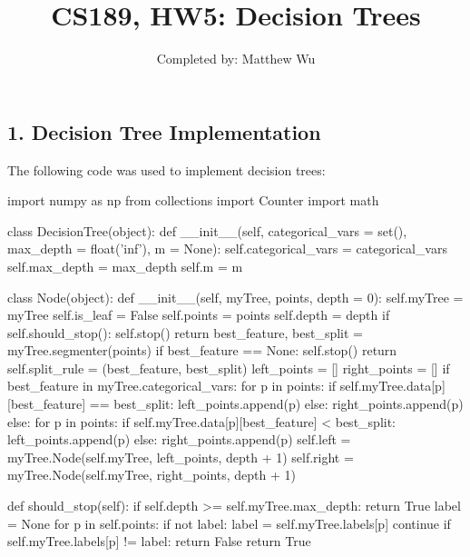 \documentclass{article}
\title{CS189, HW5: Decision Trees}
\author{ Completed by: Matthew Wu}
\date{}
\begin{document}
\maketitle

\subsection*{1. Decision Tree Implementation}
The following code was used to implement decision trees:

\begin{python}
import numpy as np
from collections import Counter
import math

class DecisionTree(object):
    def __init__(self, categorical_vars = set(), max_depth = float('inf'), m = None):
        self.categorical_vars = categorical_vars
        self.max_depth = max_depth
        self.m = m

    class Node(object):
        def __init__(self, myTree, points, depth = 0):
            self.myTree = myTree
            self.is_leaf = False
            self.points = points
            self.depth = depth
            if self.should_stop():
                self.stop()
                return
            best_feature, best_split = myTree.segmenter(points)
            if best_feature == None:
                self.stop()
                return
            self.split_rule = (best_feature, best_split)
            left_points = []
            right_points = []
            if best_feature in myTree.categorical_vars:
                for p in points:
                    if self.myTree.data[p][best_feature] == best_split:
                        left_points.append(p)
                    else:
                        right_points.append(p)
            else:
                for p in points:
                    if self.myTree.data[p][best_feature] < best_split:
                        left_points.append(p)
                    else:
                        right_points.append(p)
            self.left = myTree.Node(self.myTree, left_points, depth + 1)
            self.right = myTree.Node(self.myTree, right_points, depth + 1)

        def should_stop(self):
            if self.depth >= self.myTree.max_depth:
                return True
            label = None
            for p in self.points:
                if not label:
                    label = self.myTree.labels[p]
                    continue
                if self.myTree.labels[p] != label:
                    return False
            return True


\end{python}
\end{document}
